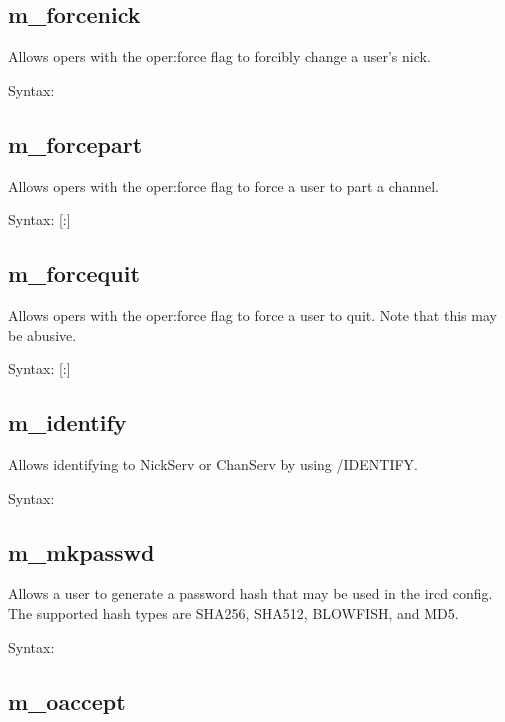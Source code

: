 \subsection{m\_forcenick}

	Allows opers with the oper:force flag to forcibly change a user's nick.

	Syntax:   

\subsection{m\_forcepart}

	Allows opers with the oper:force flag to force a user to part a channel.

	Syntax:    [:]

\subsection{m\_forcequit}

	Allows opers with the oper:force flag to force a user to quit.  Note that this may
	be abusive.


	Syntax:   [:]

\subsection{m\_identify}

	Allows identifying to NickServ or ChanServ by using /IDENTIFY.

	Syntax:   

\subsection{m\_mkpasswd}

	Allows a user to generate a password hash that may be used in the ircd config.
	The supported hash types are SHA256, SHA512, BLOWFISH, and MD5.

	Syntax:   

\subsection{m\_oaccept}

